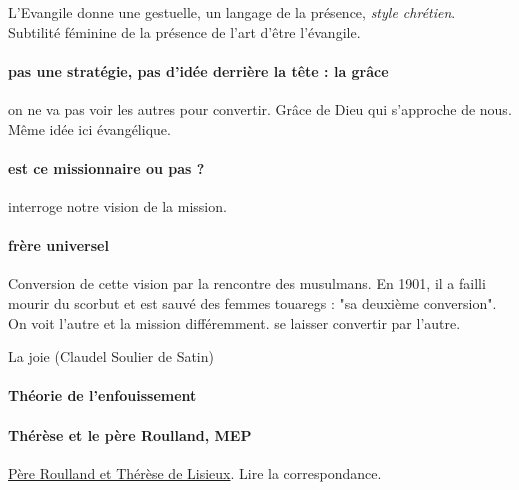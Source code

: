 L'Evangile donne une gestuelle, un langage de la présence, \textit{style chrétien}. Subtilité féminine de la présence de l'art d'être l'évangile. 

\paragraph{pas une stratégie, pas d'idée derrière la tête : la grâce} on ne va pas voir les autres pour convertir. Grâce de Dieu qui s'approche de nous. Même idée ici évangélique. 

\paragraph{est ce missionnaire ou pas ?} interroge notre vision de la mission. 

\paragraph{frère universel} Conversion de cette vision par la rencontre des musulmans. En 1901, il a failli mourir du scorbut et est sauvé des femmes touaregs : "sa deuxième conversion". On voit l'autre  et la mission différemment. se laisser convertir par l'autre.


\begin{singlequote}
    La joie (Claudel Soulier de Satin)
\end{singlequote}


\paragraph{Théorie de l'enfouissement}

\paragraph{Thérèse et le père Roulland, MEP} \href{https://missionsetrangeres.com/lunion-apostolique-de-sainte-therese-et-du-pere-adolphe-roulland-missionnaire-en-chine/}{Père Roulland et Thérèse de Lisieux}. Lire la correspondance.
